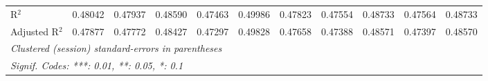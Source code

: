 \begin{tabular}{lcccccccccc}
   R$^2$                                      & 0.48042  & 0.47937     & 0.48590      & 0.47463  & 0.49986       & 0.47823  & 0.47554  & 0.48733       & 0.47564  & 0.48733\\  
   Adjusted R$^2$                             & 0.47877  & 0.47772     & 0.48427      & 0.47297  & 0.49828       & 0.47658  & 0.47388  & 0.48571       & 0.47397  & 0.48570\\  
   \midrule \midrule
   \multicolumn{11}{l}{\emph{Clustered (session) standard-errors in parentheses}}\\
   \multicolumn{11}{l}{\emph{Signif. Codes: ***: 0.01, **: 0.05, *: 0.1}}\\
\end{tabular}
\par\endgroup


